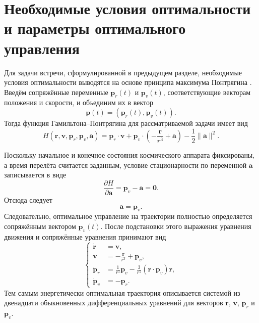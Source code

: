 \section{Необходимые условия оптимальности и параметры оптимального управления}

Для задачи встречи, сформулированной в предыдущем разделе, необходимые условия оптимальности выводятся на основе принципа максимума Понтрягина \cite{pontryagin_optimal_processes_ru_1976}. Введём сопряжённые переменные $\mathbf p_r(t)$ и $\mathbf p_v(t)$, соответствующие векторам положения и скорости, и объединим их в вектор
\begin{equation}
	\mathbf p(t)=\left(\mathbf p_r(t),\mathbf p_v(t)\right).
\end{equation}
Тогда функция Гамильтона--Понтрягина для рассматриваемой задачи имеет вид
\begin{equation}
	H(\mathbf r,\mathbf v,\mathbf p_r,\mathbf p_v,\mathbf a)
	=
	\mathbf p_r\cdot \mathbf v
	+
	\mathbf p_v\cdot\left(-\frac{\mathbf r}{r^3}+\mathbf a\right)
	-
	\frac{1}{2}\|\mathbf a\|^2.
\end{equation}

Поскольку начальное и конечное состояния космического аппарата фиксированы, а время перелёта считается заданным, условие стационарности по переменной $\mathbf a$ записывается в виде
\begin{equation}
	\frac{\partial H}{\partial \mathbf a}=\mathbf p_v-\mathbf a=\mathbf 0.
\end{equation}
Отсюда следует
\begin{equation}
	\mathbf a=\mathbf p_v.
\end{equation}
Следовательно, оптимальное управление на траектории полностью определяется сопряжённым вектором $\mathbf p_v(t)$. После подстановки этого выражения уравнения движения и сопряжённые уравнения принимают вид
\begin{equation}
	\left\{
	\begin{aligned}
		\dot{\mathbf r} &= \mathbf v,\\
		\dot{\mathbf v} &= -\frac{\mathbf r}{r^3}+\mathbf p_v,\\
		\dot{\mathbf p}_r &= \frac{1}{r^3}\mathbf p_v-\frac{3}{r^5}\left(\mathbf r\cdot \mathbf p_v\right)\mathbf r,\\
		\dot{\mathbf p}_v &= -\mathbf p_r.
	\end{aligned}
	\right.
\end{equation}
Тем самым энергетически оптимальная траектория описывается системой из двенадцати обыкновенных дифференциальных уравнений для векторов $\mathbf r$, $\mathbf v$, $\mathbf p_r$ и $\mathbf p_v$.

